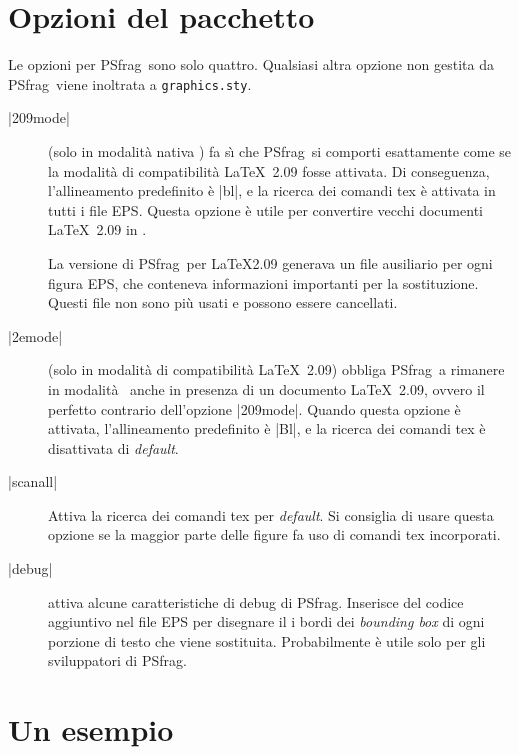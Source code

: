 \documentclass[a4paper,11pt]{ltxguide}
\let\pkg\textsf
\let\fname\texttt
\newcommand{\pfg}{\pkg{PSfrag}}
\def\cs#1{%
  {\ttfamily\expandafter\string\csname #1\endcsname}}
\begin{document}
\section{Opzioni del pacchetto}

Le opzioni per \pfg\  sono solo quattro. Qualsiasi altra opzione non gestita da
 \pfg\ viene inoltrata a 
\fname{graphics.sty}.
\begin{description}
\item[|209mode|] (solo in modalit\`a nativa 
\LaTeXe) fa s\`{\i} che \pfg\
si comporti esattamente come se la modalit\`a di compatibilit\`a \LaTeX\ 2.09  
fosse attivata. Di conseguenza, l'allineamento predefinito \`e |bl|, 
e la ricerca dei comandi \cs{tex}  
\`e attivata in tutti i file EPS.
Questa opzione \`e utile per convertire vecchi documenti \LaTeX\ 2.09 
in \LaTeXe.

La versione di \pfg\  per \LaTeX 2.09 generava un file ausiliario 
per ogni figura EPS, che conteneva informazioni importanti per la sostituzione.
Questi file non sono pi\`u usati e possono essere cancellati.

\item[|2emode|] (solo in modalit\`a di compatibilit\`a \LaTeX\ 2.09)
obbliga \pfg\  a rimanere in modalit\`a \LaTeXe\  anche in presenza 
di un documento \LaTeX\ 2.09, ovvero il perfetto contrario dell'opzione 
 |209mode|.  Quando questa opzione \`e  attivata, 
 l'allineamento predefinito \`e |Bl|, e  
la ricerca dei comandi \cs{tex} \`e disattivata di \emph{default}.

\item[|scanall|] Attiva la ricerca dei comandi \cs{tex} per \emph{default}.
  Si consiglia di usare questa opzione se la maggior parte delle
  figure fa uso di comandi \cs{tex} incorporati. %
        
\item[|debug|] attiva alcune caratteristiche di debug di \pfg.
  Inserisce del codice aggiuntivo nel file EPS per disegnare il i
  bordi dei \emph{bounding box} di ogni porzione di testo che viene
  sostituita.  Probabilmente \`e utile solo per gli sviluppatori di
  \pfg.
\end{description}

\section{Un esempio}\label{sec:example}
\end{document}
